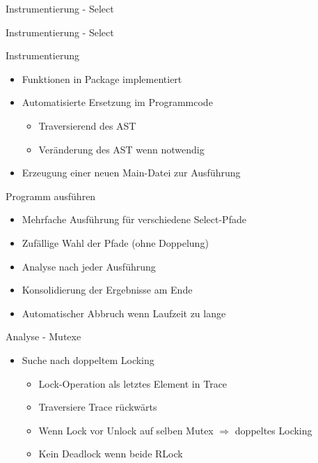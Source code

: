 \documentclass[aspectratio=169]{beamer}  %
\begin{document}
\begin{frame}{Instrumentierung - Select}
  
\end{frame}

\begin{frame}{Instrumentierung - Select}
  
\end{frame}

\begin{frame}{Instrumentierung}
  \begin{itemize}
    \item Funktionen in Package implementiert
    \item Automatisierte Ersetzung im Programmcode
    \begin{itemize}
      \item Traversierend des AST
      \item Veränderung des AST wenn notwendig
    \end{itemize}
    \item Erzeugung einer neuen Main-Datei zur Ausführung
  \end{itemize}
\end{frame}


\begin{frame}{Programm ausführen}
  \begin{itemize}
    \item Mehrfache Ausführung für verschiedene Select-Pfade
    \item Zufällige Wahl der Pfade (ohne Doppelung)
    \item Analyse nach jeder Ausführung
    \item Konsolidierung der Ergebnisse am Ende
    \item Automatischer Abbruch wenn Laufzeit zu lange
  \end{itemize}
\end{frame}


\begin{frame}{Analyse - Mutexe}
  \begin{itemize}
    \item Suche nach doppeltem Locking
    \begin{itemize}
      \item Lock-Operation als letztes Element in Trace
      \item Traversiere Trace rückwärts
      \item Wenn Lock vor Unlock auf selben Mutex $\Rightarrow$ doppeltes Locking
      \item Kein Deadlock wenn beide RLock
    \end{itemize}
  \end{itemize}
\end{frame}
\end{document}
